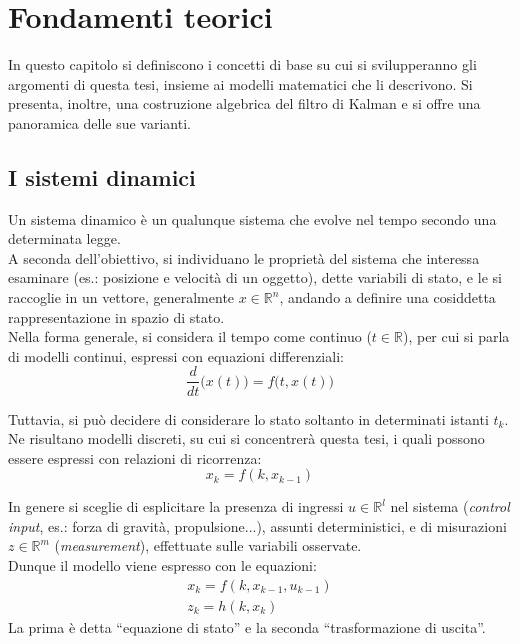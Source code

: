 \documentclass[12pt,a4paper,openright,twoside]{book}
\begin{document}
\chapter{Fondamenti teorici}

In questo capitolo si definiscono i concetti di base su cui si svilupperanno gli argomenti di questa tesi, insieme ai modelli matematici che li descrivono. Si presenta, inoltre, una costruzione algebrica del filtro di Kalman e si offre una panoramica delle sue varianti.

\section{I sistemi dinamici}

Un sistema dinamico è un qualunque sistema che evolve nel tempo secondo una determinata legge. \\

A seconda dell'obiettivo, si individuano le proprietà del sistema che interessa esaminare (es.: posizione e velocità di un oggetto), dette variabili di stato, e le si raccoglie in un vettore, generalmente $x\in\mathbb{R}^n$, andando a definire una cosiddetta rappresentazione in spazio di stato. \\
Nella forma generale, si considera il tempo come continuo ($t\in\mathbb{R}$), per cui si parla di modelli continui, espressi con equazioni differenziali:
$$\dfrac{d}{dt}\bigl(x(t)\bigr)=f\bigl(t,x(t)\bigr)$$ \pagebreak

Tuttavia, si può decidere di considerare lo stato soltanto in determinati istanti $t_k$. Ne risultano modelli discreti, su cui si concentrerà questa tesi, i quali possono essere espressi con relazioni di ricorrenza:
$$x_k=f(k,x_{k-1})$$

In genere si sceglie di esplicitare la presenza di ingressi $u\in\mathbb{R}^l$ nel sistema (\textit{control input}, es.: forza di gravità, propulsione...), assunti deterministici, e di misurazioni $z\in\mathbb{R}^m$ (\textit{measurement}), effettuate sulle variabili osservate. \\
Dunque il modello viene espresso con le equazioni:
\begin{gather*}
x_k=f(k,x_{k-1},u_{k-1}) \\
z_k=h(k,x_k)
\end{gather*}
La prima è detta ``equazione di stato'' e la seconda ``trasformazione di uscita''. \\
\end{document}
